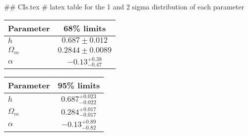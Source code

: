 ## CIs.tex
# latex table for the 1 and 2 sigma distribution of each parameter

\begin{tabular} { l  c}
 Parameter &  68\% limits\\
\hline
{\boldmath$h              $} & $0.687\pm 0.012            $\\
{\boldmath$\Omega_m       $} & $0.2844\pm 0.0089          $\\
{\boldmath$\alpha         $} & $-0.13^{+0.38}_{-0.47}     $\\
\hline
\end{tabular}

\begin{tabular} { l  c}
 Parameter &  95\% limits\\
\hline
{\boldmath$h              $} & $0.687^{+0.023}_{-0.022}   $\\
{\boldmath$\Omega_m       $} & $0.284^{+0.017}_{-0.017}   $\\
{\boldmath$\alpha         $} & $-0.13^{+0.89}_{-0.82}     $\\
\hline
\end{tabular}
